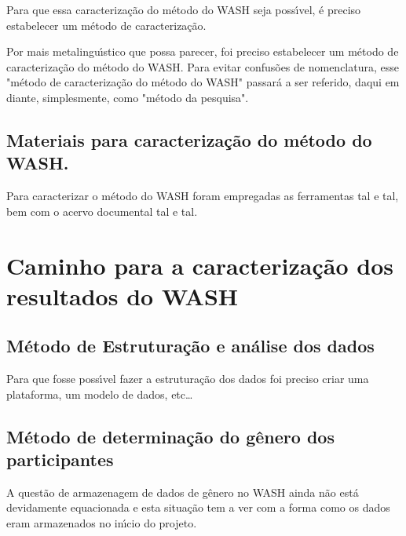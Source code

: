 \documentclass[
12pt,		%
openright,	%
twoside,  %
a4paper,			%
chapter=TITLE,		%
english,			%
french,				%
spanish,			%
brazil				%
]{USPSC-classe/USPSC}
\begin{document}
Para que essa caracteriza\c{c}\~ao do m\'etodo do WASH seja poss\'{\i}vel, \'e preciso estabelecer um m\'etodo de caracteriza\c{c}\~ao.


Por mais metalingu\'{\i}stico que possa parecer, foi preciso estabelecer um m\'etodo de caracteriza\c{c}\~ao do m\'etodo do WASH. Para evitar confus\~oes de nomenclatura, esse "m\'etodo de caracteriza\c{c}\~ao do m\'etodo do WASH" passar\'a a ser referido, daqui em diante, simplesmente, como "m\'etodo da pesquisa".





\subsection[Materiais para caracteriza\c{c}\~ao do m\'etodo do WASH.]{Materiais para caracteriza\c{c}\~ao do m\'etodo do WASH.}\label{Materiais para caracteriza\c{c}\~ao do m\'etodo do WASH.}
Para caracterizar o m\'etodo do WASH foram empregadas as ferramentas tal e tal, bem com o acervo documental tal e tal.


\section[Caminho para a caracteriza\c{c}\~ao dos resultados do WASH]{Caminho para a caracteriza\c{c}\~ao dos resultados do WASH}\label{Caminho para a caracteriza\c{c}\~ao dos resultados do WASH}
\subsection[M\'etodo de Estrutura\c{c}\~ao e an\'alise dos dados]{M\'etodo de Estrutura\c{c}\~ao e an\'alise dos dados}\label{M\'etodo de Estrutura\c{c}\~ao e an\'alise dos dados}
Para que fosse poss\'{\i}vel fazer a estrutura\c{c}\~ao dos dados foi preciso criar uma plataforma, um modelo de dados, etc…


\subsection[M\'etodo de determina\c{c}\~ao do g\^enero dos participantes]{M\'etodo de determina\c{c}\~ao do g\^enero dos participantes}\label{M\'etodo de determina\c{c}\~ao do g\^enero dos participantes}
A quest\~ao de armazenagem de dados de g\^enero no WASH ainda n\~ao est\'a devidamente equacionada e esta situa\c{c}\~ao tem a ver com a forma como os dados eram armazenados no in\'{\i}cio do projeto.
\end{document}
